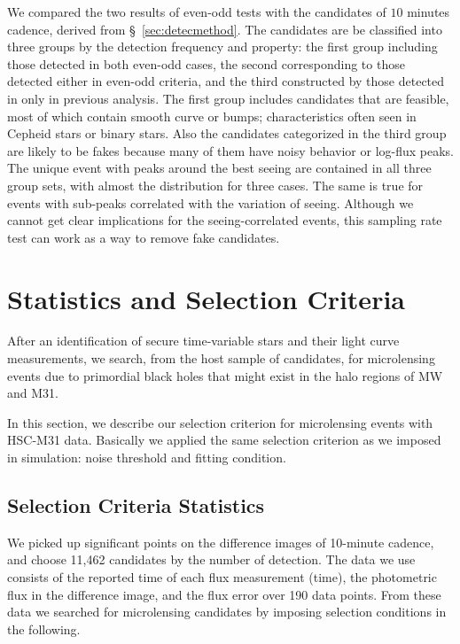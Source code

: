 \documentclass[iop, apj]{emulateapj}
\newcommand{\?}{\stackrel{?}{=}}
\begin{document}
\begin{itemize}
We compared the two results of even-odd tests with the candidates of $10$ minutes cadence, derived from \S~\ref{sec:detecmethod}. The candidates are be classified into three groups by the detection frequency and property: the first group including those detected in both even-odd cases, the second corresponding to those detected either in even-odd criteria, and the third constructed by those detected in only in previous analysis. The first group includes candidates that are feasible, most of which contain smooth curve or bumps; characteristics often seen in Cepheid stars or binary stars. 
Also the candidates categorized in the third group are likely to be fakes because many of them have noisy behavior or log-flux peaks. The unique event with peaks around the best seeing are contained in all three group sets, with almost the distribution for three cases. The same is true for events with sub-peaks correlated with the variation of seeing. Although we cannot get clear implications for the seeing-correlated events, this sampling rate test can work as a way to remove fake candidates. 
%
\end{itemize}



\section{Statistics and Selection Criteria}%
\label{sec:res2}
After an identification of secure time-variable stars and their light curve measurements, 
we search, from the host sample of candidates, for microlensing events 
due to primordial black holes that might exist in the halo regions of MW and M31. 

In this section, we describe our selection criterion for microlensing events with HSC-M31 data. 
Basically we applied the same selection criterion as we imposed in simulation: 
noise threshold and fitting condition. 


\subsection{Selection Criteria Statistics}


We picked up significant points on the difference images of 10-minute cadence, 
and choose 11,462 candidates by the number of detection. %
The data we use consists of the reported time of each flux measurement (time), 
the photometric flux in the difference image, and the flux error 
over 190 data points. 
From these data we searched for microlensing candidates by imposing selection conditions in the following. 
\end{document}
